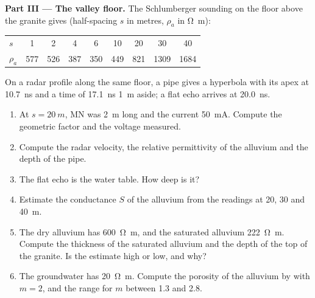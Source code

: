 \begin{problem}
\medskip\noindent\textbf{Part III --- The valley floor.} The Schlumberger
sounding on the floor above the granite gives (half-spacing $s$ in
metres, $\rho_a$ in \unit{\ohm\metre}):
\begin{center}
\small
\begin{tabular}{lcccccccc}
\hline
$s$ & 1 & 2 & 4 & 6 & 10 & 20 & 30 & 40 \\
$\rho_a$ & 577 & 526 & 387 & 350 & 449 & 821 & 1309 & 1684 \\
\hline
\end{tabular}
\end{center}
On a radar profile along the same floor, a pipe gives a hyperbola with
its apex at \qty{10.7}{ns} and a time of \qty{17.1}{ns} \qty{1}{m}
aside; a flat echo arrives at \qty{20.0}{ns}.
\begin{enumerate}[resume]
\item At $s = \qty{20}{m}$, MN was \qty{2}{m} long and the current
  \qty{50}{mA}. Compute the geometric factor and the voltage measured.
\item Compute the radar velocity, the relative permittivity of the
  alluvium and the depth of the pipe.
\item The flat echo is the water table. How deep is it?
\item Estimate the conductance $S$ of the alluvium from the readings at
  20, 30 and \qty{40}{m}.
\item The dry alluvium has \qty{600}{\ohm\metre}, and the saturated
  alluvium \qty{222}{\ohm\metre}. Compute the thickness of the saturated
  alluvium and the depth of the top of the granite. Is the estimate high
  or low, and why?
\item The groundwater has \qty{20}{\ohm\metre}. Compute the porosity of
  the alluvium by  with $m = 2$, and the range for $m$
  between \num{1.3} and \num{2.8}.
\end{enumerate}


\end{problem}
